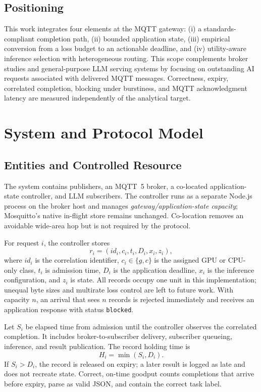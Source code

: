 \documentclass[journal]{IEEEtran}
\begin{document}
\subsection{Positioning}

This work integrates four elements at the MQTT gateway: (i) a standards-compliant completion path, (ii) bounded application state, (iii) empirical conversion from a loss budget to an actionable deadline, and (iv) utility-aware inference selection with heterogeneous routing. This scope complements broker studies and general-purpose LLM serving systems by focusing on outstanding AI requests associated with delivered MQTT messages. Correctness, expiry, correlated completion, blocking under burstiness, and MQTT acknowledgment latency are measured independently of the analytical target.
\section{System and Protocol Model}
\label{sec:system}

\subsection{Entities and Controlled Resource}

The system contains publishers, an MQTT~5 broker, a co-located application-state controller, and LLM subscribers. The controller runs as a separate Node.js process on the broker host and manages \emph{gateway/application-state capacity}; Mosquitto's native in-flight store remains unchanged. Co-location removes an avoidable wide-area hop but is not required by the protocol.

For request $i$, the controller stores
\begin{equation}
 r_i=(id_i,c_i,t_i,D_i,x_i,z_i),
\end{equation}
where $id_i$ is the correlation identifier, $c_i\in\{g,c\}$ is the assigned GPU or CPU-only class, $t_i$ is admission time, $D_i$ is the application deadline, $x_i$ is the inference configuration, and $z_i$ is state. All records occupy one unit in this implementation; unequal byte sizes and multirate loss control are left to future work. With capacity $n$, an arrival that sees $n$ records is rejected immediately and receives an application response with status \texttt{blocked}.

Let $S_{i}$ be elapsed time from admission until the controller observes the correlated completion. It includes broker-to-subscriber delivery, subscriber queueing, inference, and result publication. The record holding time is
\begin{equation}
 H_i=\min(S_i,D_i).
 \label{eq:holding}
\end{equation}
If $S_i>D_i$, the record is released on expiry; a later result is logged as late and does not recreate state. Correct, on-time goodput counts completions that arrive before expiry, parse as valid JSON, and contain the correct task label.
\end{document}
